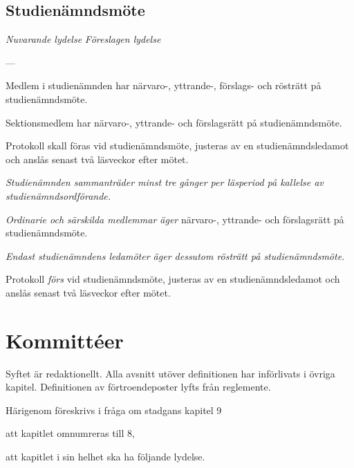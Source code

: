 \documentclass{article}
\newenvironment{lydelse}
    {\begin{paracol}{2}%
        \emph{Nuvarande lydelse}%
        \switchcolumn%
        \emph{Föreslagen lydelse}%
    \end{paracol}%
    \begin{enumerate}[label=\thesubsection.\arabic*]%
    \begin{paracol}{2}%
    }{\end{paracol}\end{enumerate}}
\begin{document}
\subsection{Studienämndsmöte}
\begin{lydelse}
  \setcounter{section}{8}
  \setcounter{subsection}{4}
  \item[] ---
  \item Medlem i studienämnden har närvaro-, yttrande-, förslags- och rösträtt på studienämndsmöte.
  \item Sektionsmedlem har närvaro-, yttrande- och förslagsrätt på studienämndsmöte.
  \setcounter{subsection}{3}
  \setcounter{enumi}{0}   
  \item Protokoll skall föras vid studienämndsmöte, justeras av en studienämndsledamot och anslås senast två läsveckor efter mötet.
  \switchcolumn
  \setcounter{section}{7}
  \setcounter{subsection}{1}
  \item \emph{Studienämnden sammanträder minst tre gånger per läsperiod på kallelse av studienämndsordförande.}
  \item \emph{Ordinarie och särskilda medlemmar äger} närvaro-, yttrande- och förslagsrätt på studienämndsmöte. \label{7.x:SNFrätt}
  \item \emph{Endast studienämndens ledamöter äger dessutom rösträtt på studienämndsmöte.}
  \item Protokoll \emph{förs} vid studienämndsmöte, justeras av en studienämndsledamot och anslås senast två läsveckor efter mötet.
\end{lydelse}
\setcounter{section}{7}
\setcounter{subsection}{2}

\section{Kommittéer}
Syftet är redaktionellt.
Alla avsnitt utöver definitionen har införlivats i övriga kapitel.
Definitionen av förtroendeposter lyfts från reglemente.

Härigenom föreskrivs i fråga om stadgans kapitel 9
\begin{dels}
\item att kapitlet omnumreras till 8,
\item att kapitlet i sin helhet ska ha följande lydelse.
\end{dels}
\end{document}
